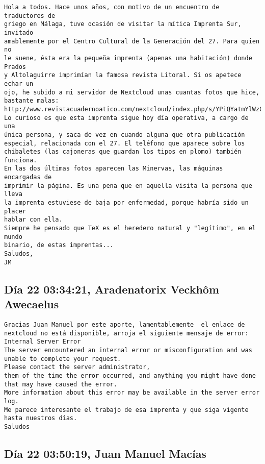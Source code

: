 \documentclass[a4paper,10pt]{article}
\begin{document}
\begin{lstlisting}
Hola a todos. Hace unos años, con motivo de un encuentro de traductores de
griego en Málaga, tuve ocasión de visitar la mítica Imprenta Sur, invitado
amablemente por el Centro Cultural de la Generación del 27. Para quien no
le suene, ésta era la pequeña imprenta (apenas una habitación) donde Prados
y Altolaguirre imprimían la famosa revista Litoral. Si os apetece echar un
ojo, he subido a mi servidor de Nextcloud unas cuantas fotos que hice,
bastante malas:
http://www.revistacuadernoatico.com/nextcloud/index.php/s/YPiQYatmYlWzCcx
Lo curioso es que esta imprenta sigue hoy día operativa, a cargo de una
única persona, y saca de vez en cuando alguna que otra publicación
especial, relacionada con el 27. El teléfono que aparece sobre los
chibaletes (las cajoneras que guardan los tipos en plomo) también funciona.
En las dos últimas fotos aparecen las Minervas, las máquinas encargadas de
imprimir la página. Es una pena que en aquella visita la persona que lleva
la imprenta estuviese de baja por enfermedad, porque habría sido un placer
hablar con ella.
Siempre he pensado que TeX es el heredero natural y "legítimo", en el mundo
binario, de estas imprentas...
Saludos,
JM

\end{lstlisting}

\subsection{Día 22 03:34:21, Aradenatorix Veckhôm Awecaelus}

\begin{lstlisting}
Gracias Juan Manuel por este aporte, lamentablemente  el enlace de
nextcloud no está disponible, arroja el siguiente mensaje de error:
Internal Server Error
The server encountered an internal error or misconfiguration and was
unable to complete your request.
Please contact the server administrator, 
them of the time the error occurred, and anything you might have done
that may have caused the error.
More information about this error may be available in the server error log.
Me parece interesante el trabajo de esa imprenta y que siga vigente
hasta nuestros días.
Saludos

\end{lstlisting}

\subsection{Día 22 03:50:19, Juan Manuel Macías}
\end{document}
